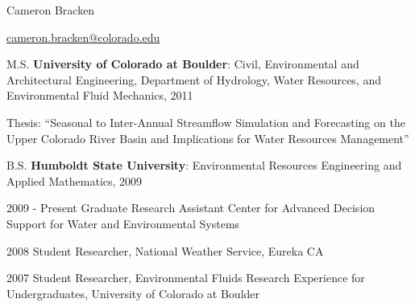\documentclass[10pt,a4paper]{scrartcl}
\begin{document}
    \begin{cv}{}
        \begin{cvlist}{}\label{info}  
            \item   Cameron Bracken
            \item   \url{cameron.bracken@colorado.edu}
        \end{cvlist}
        
        \begin{cvlist}{}\label{edu}
            \item[M.S.] \textbf{University of Colorado at Boulder}: { Civil, Environmental and Architectural Engineering, Department of Hydrology, Water Resources, and Environmental Fluid Mechanics},  2011
            \item Thesis: ``Seasonal to Inter-Annual Streamflow Simulation and Forecasting on the Upper Colorado River Basin and Implications for Water Resources Management''
            \item[B.S.] \textbf{Humboldt State University}: {Environmental Resources Engineering and Applied Mathematics}, 2009
        \end{cvlist}
        
        \begin{cvlist}{}\label{exp}
            {\setlength{\itemsep}{1pt}
            \setlength{\parskip}{0pt}
            \setlength{\parsep}{0pt}
            
            \item[2009 - Present] Graduate Research Assistant Center for Advanced Decision Support for Water and Environmental Systems
            }
            \item[2008] Student Researcher, National Weather Service, Eureka CA
            \item[2007] Student Researcher, Environmental Fluids Research Experience for Undergraduates, University of Colorado at Boulder
        \end{cvlist}
        
        

\end{cv}
\end{document}
